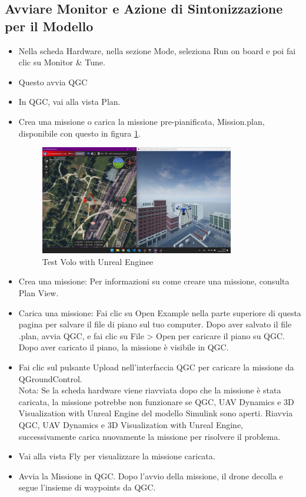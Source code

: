 \subsection{Avviare Monitor e Azione di Sintonizzazione per il Modello}
\begin{itemize}
    \item Nella scheda Hardware, nella sezione Mode, seleziona Run on board e poi fai clic su Monitor \& Tune.
    \item Questo avvia QGC
    \item In QGC, vai alla vista Plan.
    \item Crea una missione o carica la missione pre-pianificata, Mission.plan, disponibile con questo in figura \ref{fig:Test Volo with Unreal Enginee}.
    \begin{figure}[H] %
      \centering
      \includegraphics[width=0.8\textwidth]{files/images/test_volo.png} %
      \caption{Test Volo with Unreal Enginee} %
      \label{fig:Test Volo with Unreal Enginee} %
    \end{figure}
\noindent
    \item Crea una missione: Per informazioni su come creare una missione, consulta Plan View.
    \item Carica una missione: Fai clic su Open Example nella parte superiore di questa pagina per salvare il file di piano sul tuo computer. Dopo aver salvato il file .plan, avvia QGC, e fai clic su File > Open per caricare il piano su QGC. Dopo aver caricato il piano, la missione è visibile in QGC.
    \item Fai clic sul pulsante Upload nell'interfaccia QGC per caricare la missione da QGroundControl.
    \\
    Nota: Se la scheda hardware viene riavviata dopo che la missione è stata caricata, la missione potrebbe non funzionare se QGC, UAV Dynamics e 3D Visualization with Unreal Engine del modello Simulink sono aperti. Riavvia QGC, UAV Dynamics e 3D Visualization with Unreal Engine, successivamente carica nuovamente la missione per risolvere il problema.
    \\
    \item Vai alla vista Fly per visualizzare la missione caricata.
    \item Avvia la Missione in QGC. Dopo l'avvio della missione, il drone decolla e segue l'insieme di waypoints da QGC.
\end{itemize}

